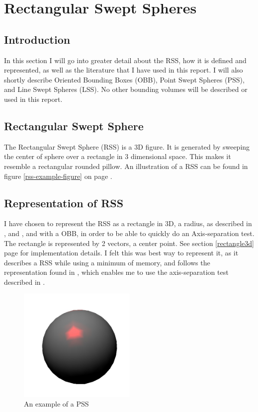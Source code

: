 
\section{Rectangular Swept Spheres}
\label{rss}

\subsection{Introduction}
In this section I will go into greater detail about the RSS, how it is defined and represented, as well as the literature that I have used in this report. I will also shortly describe Oriented Bounding Boxes (OBB), Point Swept Spheres (PSS), and Line Swept Spheres (LSS). No other bounding volumes will be described or used in this report.

\subsection{Rectangular Swept Sphere}
The Rectangular Swept Sphere (RSS) is a 3D figure. It is generated by sweeping the center of sphere over a rectangle in 3 dimensional space. This makes it resemble a rectangular rounded pillow. An illustration of a RSS can be found in figure \ref{rss-example-figure} on page \pageref{rss-example-figure}. 

\subsection{Representation of RSS}
I have chosen to represent the RSS as a rectangle in 3D, a radius, as described in \cite{larsen00fast}, \cite{Larsen99fastproximity} and \cite{237244}, and with a OBB, in order to be able to quickly do an Axis-separation test. The rectangle is represented by 2 vectors, a center point. See section \ref{rectangle3d} page \pageref{rectangle3d} for  implementation details. I felt this was best way to represent it, as it describes a RSS while using a minimum of memory, and follows the representation found in \cite{237244}, which enables me to use the axis-separation test described in \cite{237244}.

\begin{figure}
\centering
\includegraphics[width=0.5\textwidth]{figures/pss}
\caption{\label{pss-example}An example of a PSS}
\end{figure}

